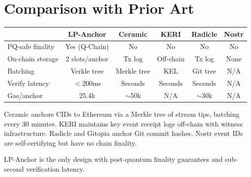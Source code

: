 \section{Comparison with Prior Art}

\label{sec:comparison}

\begin{center}
\begin{tabular}{lccccc}
\toprule
 & \textbf{LP-Anchor} & \textbf{Ceramic} & \textbf{KERI} & \textbf{Radicle} & \textbf{Nostr} \\
\midrule
PQ-safe finality & Yes (Q-Chain) & No & No & No & No \\
On-chain storage & 2 slots/anchor & Tx log & Off-chain & Tx log & None \\
Batching & Verkle tree & Merkle tree & KEL & Git tree & N/A \\
Verify latency & $<200$ms & Seconds & Seconds & Seconds & N/A \\
Gas/anchor & 25.4k & $\sim$50k & N/A & $\sim$30k & N/A \\
\bottomrule
\end{tabular}
\end{center}

\noindent
Ceramic anchors CIDs to Ethereum via a Merkle tree of stream tips,
batching every 30 minutes. KERI maintains key event receipt logs off-chain
with witness infrastructure. Radicle and Gitopia anchor Git commit hashes.
Nostr event IDs are self-certifying but have no chain finality.

LP-Anchor is the only design with post-quantum finality guarantees and
sub-second verification latency.

